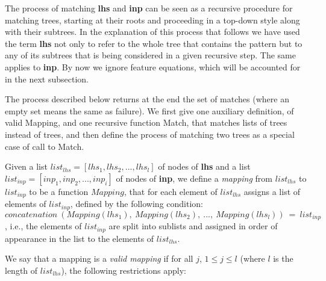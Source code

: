 The process of matching {\bf lhs} and {\bf inp} can be seen as a recursive 
procedure for matching trees, starting at their roots and proceeding in a 
top-down style along with their subtrees. 
In the explanation of this process that 
follows we have used the term {\bf lhs} not only to refer to the whole tree 
that contains the pattern 
but to any of its subtrees that is being considered in a 
given recursive step. The same applies to {\bf inp}. 
By now we ignore feature equations,
which will be accounted for in the next subsection.

The process described below returns 
at the end the set of matches (where an empty set means the same 
as failure). We first give one auxiliary definition, of valid Mapping, and
one recursive function Match, that matches lists of trees instead of trees,
and then define the process of matching two trees as a special case of
call to Match.

Given a list $list_{lhs}=[lhs_1, lhs_2, ..., lhs_l]$ of nodes of {\bf lhs}
and a list $list_{inp}=[inp_1, inp_2, ..., inp_i]$ of nodes of {\bf inp},
we define a {\it mapping} from $list_{lhs}$ to $list_{inp}$ to be a function
$Mapping$,
that for each element of $list_{lhs}$ assigns a list of elements of 
$list_{inp}$, defined by the following condition:
$$concatenation\ (Mapping(lhs_1),\ Mapping(lhs_2),\ ...,\ Mapping(lhs_l))\ =\ 
	list_{inp}$$,
i.e., the elements of $list_{inp}$ are split into sublists and assigned in 
order of appearance in the list to the elements of $list_{lhs}$.

We say that a mapping is a {\it valid mapping} if for all $j$, $1\leq j \leq l$
(where $l$ is the length of $list_{lhs}$), the following restrictions apply:

